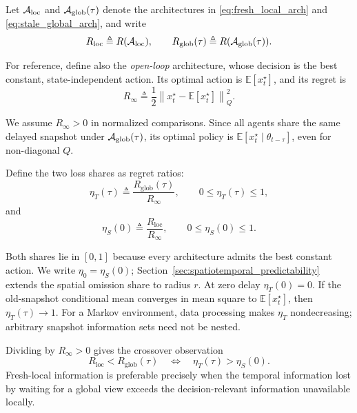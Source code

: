 \documentclass[11pt]{article}
\begin{document}
Let $\mathcal A_{\rm loc}$ and $\mathcal A_{\rm glob}(\tau)$ denote the
architectures in \eqref{eq:fresh_local_arch} and \eqref{eq:stale_global_arch}, and write
\begin{equation}
R_{\rm loc}\triangleq R(\mathcal A_{\rm loc}),\qquad
R_{\rm glob}(\tau)\triangleq R(\mathcal A_{\rm glob}(\tau)).
\label{eq:Rloc}
\end{equation}

For reference, define also the \emph{open-loop} architecture, whose decision is
the best constant, state-independent action. Its optimal action is
$\mathbb{E}[x_t^\star]$, and its regret is
\begin{equation}
    R_\infty
    \triangleq
    \frac{1}{2}
        \left\|
            x_t^\star-\mathbb{E}[x_t^\star]
        \right\|_Q^2.
    \label{eq:Rinf_general}
\end{equation}

We assume $R_\infty>0$ in normalized comparisons. Since all agents share the
same delayed snapshot under $\mathcal A_{\rm glob}(\tau)$, its optimal policy
is $\mathbb E[x_t^\star\mid\theta_{t-\tau}]$, even for non-diagonal $Q$.

Define the two loss shares as regret ratios:
\begin{equation}
    \eta_T(\tau)\triangleq\frac{R_{\mathrm{glob}}(\tau)}{R_\infty},
    \qquad 0\le\eta_T(\tau)\le1,
    \label{eq:temporal_unpredictability}
\end{equation}
and
\begin{equation}
    \eta_S(0)\triangleq\frac{R_{\mathrm{loc}}}{R_\infty},
    \qquad 0\le\eta_S(0)\le1.
    \label{eq:eta_S_local}
\end{equation}

Both shares lie in $[0,1]$ because every architecture admits the best constant
action. We write $\eta_0=\eta_S(0)$; Section~\ref{sec:spatiotemporal_predictability}
extends the spatial omission share to radius $r$. At zero delay $\eta_T(0)=0$.
If the old-snapshot conditional mean converges in mean square to
$\mathbb E[x_t^\star]$, then $\eta_T(\tau)\to1$. For a Markov environment,
data processing makes $\eta_T$ nondecreasing; arbitrary snapshot information
sets need not be nested.

Dividing by $R_\infty>0$ gives the crossover observation
\begin{equation}
    R_{\mathrm{loc}}<R_{\mathrm{glob}}(\tau)
    \quad\Longleftrightarrow\quad
    \eta_T(\tau)>\eta_S(0).
    \label{eq:general_crossover}
\end{equation}
Fresh-local information is preferable precisely when the temporal information
lost by waiting for a global view exceeds the decision-relevant information
unavailable locally.
\end{document}
